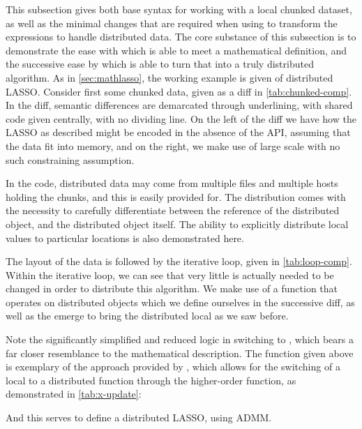 This subsection gives both base \R syntax for working with a local chunked dataset, as well as the minimal changes that are required when using \lsr to transform the expressions to handle distributed data.
The core substance of this subsection is to demonstrate the ease with which \R is able to meet a mathematical definition, and the successive ease by which \lsr is able to turn that into a truly distributed algorithm.
As in \cref{sec:mathlasso}, the working example is given of distributed LASSO.
Consider first some chunked data, given as a diff in \cref{tab:chunked-comp}.
In the diff, semantic differences are demarcated through underlining, with shared code given centrally, with no dividing line.
On the left of the diff we have how the LASSO as described might be encoded in the absence of the API, assuming that the data fit into memory, and on the right, we make use of large scale \R with no such constraining assumption.

In the \lsr code, distributed data may come from multiple files and multiple hosts holding the chunks, and this is easily provided for.
The distribution comes with the necessity to carefully differentiate between the reference of the distributed object, and the distributed object itself.
The ability to explicitly distribute local values to particular locations is also demonstrated here.


The layout of the data is followed by the iterative loop, given in \cref{tab:loop-comp}.
Within the iterative loop, we can see that very little is actually needed to be changed in order to distribute this algorithm.
We make use of a function that operates on distributed objects which we define ourselves in the successive diff, as well as the emerge to bring the distributed local as we saw before.


Note the significantly simplified and reduced logic in switching to \lsr, which bears a far closer resemblance to the mathematical description.
The  function given above is exemplary of the approach provided by \lsr, which allows for the switching of a local to a distributed function through the higher-order  function, as demonstrated in \cref{tab:x-update}:


And this serves to define a distributed LASSO, using ADMM.
